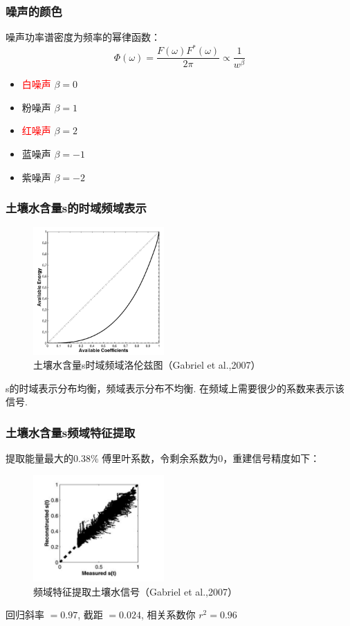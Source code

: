 \documentclass{beamer}
\begin{document}
\begin{CJK}{UTF8}{gkai}
\begin{frame}
\frametitle{噪声的颜色}
噪声功率谱密度为频率的幂律函数：
\begin{equation*}
\Phi(\omega)=\frac{F(\omega)F^*(\omega)}{2\pi} \propto \frac{1}{w^\beta}
\end{equation*}
\begin{itemize}
\item \textcolor{red}{白噪声} $\beta=0$
\item 粉噪声 $\beta=1$
\item \textcolor{red}{红噪声} $\beta=2$
\item 蓝噪声 $\beta=-1$
\item 紫噪声 $\beta=-2$
\end{itemize}
 
\end{frame}

\begin{frame}
\frametitle{土壤水含量s的时域频域表示}
\begin{figure}[H]
\centering
\includegraphics[width=5cm]{laurenz.png}
\caption{土壤水含量s时域频域洛伦兹图（Gabriel et al.,2007）}
\end{figure} 
s的时域表示分布均衡，频域表示分布不均衡. 在频域上需要很少的系数来表示该信号.
\end{frame}

\begin{frame}
\frametitle{土壤水含量s频域特征提取}
提取能量最大的0.38\% 傅里叶系数，令剩余系数为0，重建信号精度如下：
\begin{figure}[H]
\centering
\includegraphics[width=5cm]{reconstruct.png}
\caption{频域特征提取土壤水信号（Gabriel et al.,2007）}
\end{figure} 
回归斜率 $=0.97$, 截距 $= 0.024$, 相关系数你 $r^2
=0.96$


\end{frame}
\end{CJK}
\end{document}
